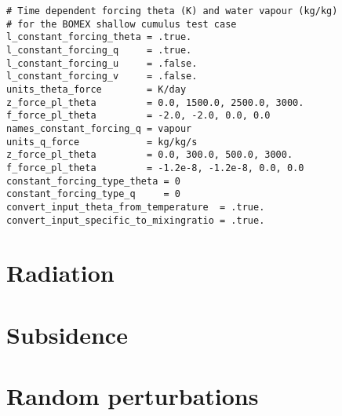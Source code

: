 \documentclass[a4paper,11pt]{article}
\begin{document}
\begin{minipage}{\linewidth}
\begin{lstlisting}[caption={Example configuration snippet for time independent
    forcing from BOMEX\_config}]
# Time dependent forcing theta (K) and water vapour (kg/kg)
# for the BOMEX shallow cumulus test case
l_constant_forcing_theta = .true.
l_constant_forcing_q     = .true.
l_constant_forcing_u     = .false.
l_constant_forcing_v     = .false.
units_theta_force        = K/day
z_force_pl_theta         = 0.0, 1500.0, 2500.0, 3000.
f_force_pl_theta         = -2.0, -2.0, 0.0, 0.0
names_constant_forcing_q = vapour
units_q_force            = kg/kg/s
z_force_pl_theta         = 0.0, 300.0, 500.0, 3000.
f_force_pl_theta         = -1.2e-8, -1.2e-8, 0.0, 0.0
constant_forcing_type_theta = 0
constant_forcing_type_q     = 0
convert_input_theta_from_temperature  = .true.
convert_input_specific_to_mixingratio = .true.
\end{lstlisting}
\end{minipage}

\section{Radiation}

\section{Subsidence}

\section{Random perturbations}
\end{document}
